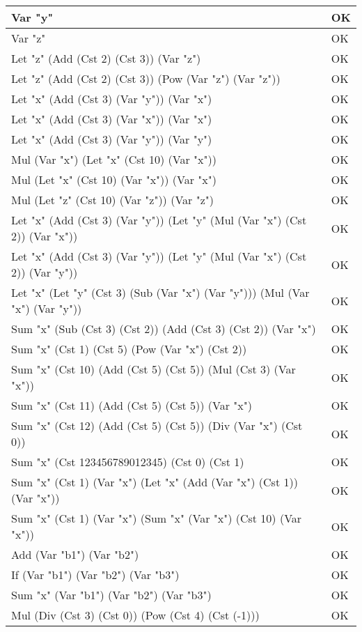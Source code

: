 \documentclass[12pt,a4paper]{article}
\begin{document}
\begin{tabularx}{\linewidth}[!htbp]{X|l}
     \hline
    Var "y" & OK \\
     \hline
    Var "z" & OK \\
     \hline
    Let "z" (Add (Cst 2) (Cst 3)) (Var "z") & OK \\
     \hline
    Let "z" (Add (Cst 2) (Cst 3)) (Pow (Var "z") (Var "z")) & OK \\
     \hline
    Let "x" (Add (Cst 3) (Var "y")) (Var "x") & OK \\
     \hline
    Let "x" (Add (Cst 3) (Var "x")) (Var "x") & OK \\
     \hline
    Let "x" (Add (Cst 3) (Var "y")) (Var "y") & OK \\
     \hline
    Mul (Var "x") (Let "x" (Cst 10) (Var "x")) & OK \\
     \hline
    Mul (Let "x" (Cst 10) (Var "x")) (Var "x") & OK \\
     \hline
    Mul (Let "z" (Cst 10) (Var "z")) (Var "z") & OK \\
     \hline
    Let "x" (Add (Cst 3) (Var "y")) (Let "y" (Mul (Var "x") (Cst 2)) (Var "x")) & OK \\
     \hline
    Let "x" (Add (Cst 3) (Var "y")) (Let "y" (Mul (Var "x") (Cst 2)) (Var "y")) & OK \\
     \hline
    Let "x" (Let "y" (Cst 3) (Sub (Var "x") (Var "y"))) (Mul (Var "x") (Var "y")) & OK \\
     \hline
    Sum "x" (Sub (Cst 3) (Cst 2)) (Add (Cst 3) (Cst 2)) (Var "x") & OK \\
     \hline
    Sum "x" (Cst 1) (Cst 5) (Pow (Var "x") (Cst 2)) & OK \\
     \hline
    Sum "x" (Cst 10) (Add (Cst 5) (Cst 5)) (Mul (Cst 3) (Var "x")) & OK \\
     \hline
    Sum "x" (Cst 11) (Add (Cst 5) (Cst 5)) (Var "x") & OK \\
     \hline
    Sum "x" (Cst 12) (Add (Cst 5) (Cst 5)) (Div (Var "x") (Cst 0)) & OK \\
     \hline
    Sum "x" (Cst 123456789012345) (Cst 0) (Cst 1) & OK \\
     \hline
    Sum "x" (Cst 1) (Var "x") (Let "x" (Add (Var "x") (Cst 1)) (Var "x")) & OK \\
     \hline
    Sum "x" (Cst 1) (Var "x") (Sum "x" (Var "x") (Cst 10) (Var "x")) & OK \\
     \hline
    Add (Var "b1") (Var "b2") & OK \\
     \hline
    If (Var "b1") (Var "b2") (Var "b3") & OK \\
     \hline
    Sum "x" (Var "b1") (Var "b2") (Var "b3") & OK \\
     \hline
    Mul (Div (Cst 3) (Cst 0)) (Pow (Cst 4) (Cst (-1))) & OK \\
     \hline
\end{tabularx}
\end{document}
